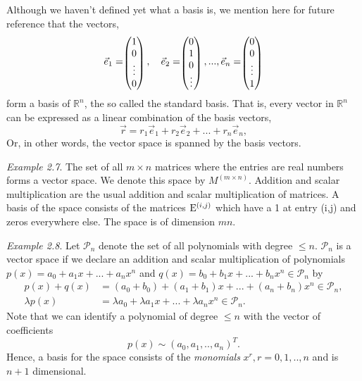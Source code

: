 \documentclass[
  letterpaper,
  DIV=11,
  numbers=noendperiod]{scrartcl}
\theoremstyle{remark}
\begin{document}
Although we haven't defined yet what a basis is, we mention here for
future reference that the vectors,
\[\vec{e}_{1} =  \scriptscriptstyle \begin{pmatrix}   1\\ 0 \\ \vdots \\ 0   \end{pmatrix} \textstyle, \quad  \vec{e}_{2} =  \scriptscriptstyle \begin{pmatrix}   0\\ 1 \\ 0 \\ \vdots  \end{pmatrix} \textstyle, ...    ,\vec{e}_{n} =  \scriptscriptstyle \begin{pmatrix}   0\\ 0 \\ \vdots \\ 1   \end{pmatrix} \textstyle\]
form a basis of \(\mathbb{R}^{n}\), the so called the standard basis.
That is, every vector in \(\mathbb{R}^{n}\) can be expressed as a linear
combination of the basis vectors,
\[\vec{r} = r_{1} \vec{e}_{1} + r_{2} \vec{e}_{2} + ... + r_{n} \vec{e}_{n} ,\]
Or, in other words, the vector space is spanned by the basis vectors.

\emph{Example 2.7}. The set of all \(m\times n\) matrices where the
entries are real numbers forms a vector space. We denote this space by
\(M^{(m \times n)}\). Addition and scalar multiplication are the usual
addition and scalar multiplication of matrices. A basis of the space
consists of the matrices \({\rm E}^{(i,j)}\) which have a 1 at entry
(i,j) and zeros everywhere else. The space is of dimension \(m n\).

\emph{Example 2.8}. Let \(\mathcal{P}_{n}\) denote the set of all
polynomials with degree \(\leq n\). \(\mathcal{P}_{n}\) is a vector
space if we declare an addition and scalar multiplication of polynomials
\(p(x)= a_{0} + a_{1}x + ...+a_{n} x^{n}\) and
\(q(x)= b_{0} + b_{1}x + ...+b_{n} x^{n}\)\(\in \mathcal{P}_{n}\) by
\[\begin{aligned}
p(x)+q(x) &= (a_{0}+ b_{0}) + (a_{1} + b_{1}) x + ...+(a_{n}+ b_{n}) x^{n}   \in \mathcal{P}_{n} ,  \\
\lambda p(x) &=  \lambda a_{0} +  \lambda a_{1}x + ...+ \lambda a_{n} x^{n}  \in \mathcal{P}_{n} . 
\end{aligned}\] Note that we can identify a polynomial of degree
\(\leq n\) with the vector of coefficients
\[p(x) \sim  (a_{0}, a_{1},.., a_{n})^{T} .\] Hence, a basis for the
space consists of the \emph{monomials} \(x^{r}, r=0,1, ..,n\) and is
\(n+1\) dimensional.
\end{document}
